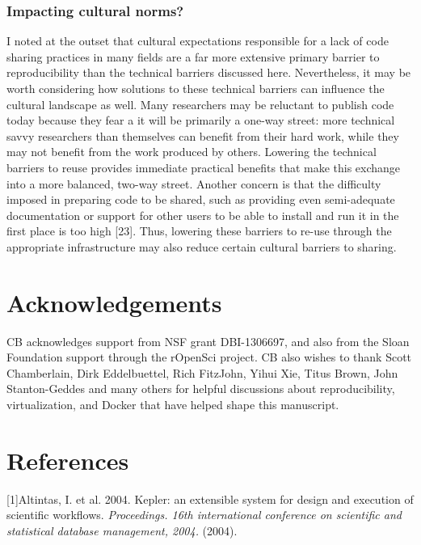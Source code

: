 \documentclass[9pt]{components/acm_proc_article-sp}
\begin{document}
\subsubsection{Impacting cultural
norms?}\label{impacting-cultural-norms}

I noted at the outset that cultural expectations responsible for a lack
of code sharing practices in many fields are a far more extensive
primary barrier to reproducibility than the technical barriers discussed
here. Nevertheless, it may be worth considering how solutions to these
technical barriers can influence the cultural landscape as well. Many
researchers may be reluctant to publish code today because they fear a
it will be primarily a one-way street: more technical savvy researchers
than themselves can benefit from their hard work, while they may not
benefit from the work produced by others. Lowering the technical
barriers to reuse provides immediate practical benefits that make this
exchange into a more balanced, two-way street. Another concern is that
the difficulty imposed in preparing code to be shared, such as providing
even semi-adequate documentation or support for other users to be able
to install and run it in the first place is too high {[}23{]}. Thus,
lowering these barriers to re-use through the appropriate infrastructure
may also reduce certain cultural barriers to sharing.

\section{Acknowledgements}\label{acknowledgements}

CB acknowledges support from NSF grant DBI-1306697, and also from the
Sloan Foundation support through the rOpenSci project. CB also wishes to
thank Scott Chamberlain, Dirk Eddelbuettel, Rich FitzJohn, Yihui Xie,
Titus Brown, John Stanton-Geddes and many others for helpful discussions
about reproducibility, virtualization, and Docker that have helped shape
this manuscript.

\section{References}\label{references}

{[}1{]}Altintas, I. et al. 2004. Kepler: an extensible system for design
and execution of scientific workflows. \emph{Proceedings. 16th
international conference on scientific and statistical database
management, 2004.} (2004).
\end{document}
